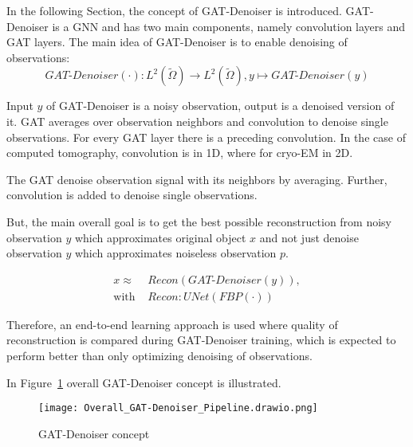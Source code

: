In the following Section, the concept of GAT-Denoiser is introduced. 
GAT-Denoiser is a GNN and has two main components, namely convolution layers and GAT layers.
The main idea of GAT-Denoiser is to enable denoising of observations:
\begin{equation}
  \textit{GAT-Denoiser} (\cdot) : L^2(\tilde{\Omega}) \to  L^2(\tilde{\Omega}) , y \mapsto \textit{GAT-Denoiser} (y) 
\end{equation}


Input $y$ of GAT-Denoiser is a noisy observation, output is a denoised version of it.
GAT averages over observation neighbors and convolution to denoise single observations. 
For every GAT layer there is a preceding convolution. 
In the case of computed tomography, convolution is in 1D, where for cryo-EM in 2D.

\begin{tcolorbox}[colback=red!5!white,colframe=red!75!black]
  The GAT denoise observation signal with its neighbors by averaging. 
  Further, convolution is added to denoise single observations.
\end{tcolorbox}


But, the main overall goal is to get the best possible reconstruction 
from noisy observation $y$ which approximates original object $x$ and 
not just denoise observation $y$ which approximates noiseless observation $p$.


\begin{equation}
  \begin{aligned}
    x \approx   &\textit{Recon} \left( \textit{GAT-Denoiser} \left( y \right) \right), \\
    \text{with } &\textit{Recon} : \textit{UNet} \left( \textit{FBP} \left( \cdot \right) \right)  
  \end{aligned}
\end{equation}

Therefore, an end-to-end learning approach is used where quality of reconstruction is 
compared during GAT-Denoiser training, which is expected to perform better than 
only optimizing denoising of observations.

In Figure~\ref{fig:overall-concept} overall GAT-Denoiser concept is illustrated.
\begin{figure}[H]
  \centering
  \texttt{[image: Overall\_GAT-Denoiser\_Pipeline.drawio.png]}
  \caption{GAT-Denoiser concept}
  \label{fig:overall-concept}
\end{figure}



